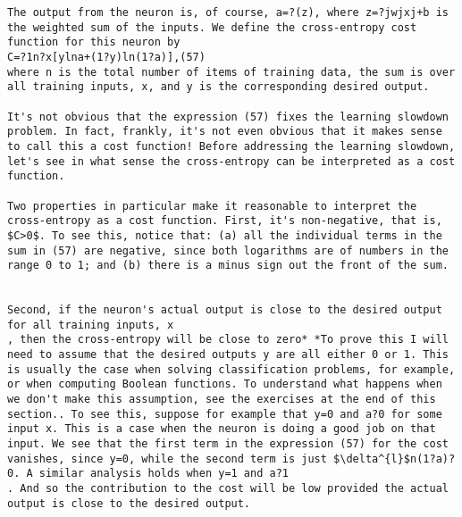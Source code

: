 \begin{lstlisting}
The output from the neuron is, of course, a=?(z), where z=?jwjxj+b is the weighted sum of the inputs. We define the cross-entropy cost function for this neuron by 
C=?1n?x[ylna+(1?y)ln(1?a)],(57)
where n is the total number of items of training data, the sum is over all training inputs, x, and y is the corresponding desired output.

It's not obvious that the expression (57) fixes the learning slowdown problem. In fact, frankly, it's not even obvious that it makes sense to call this a cost function! Before addressing the learning slowdown, let's see in what sense the cross-entropy can be interpreted as a cost function.

Two properties in particular make it reasonable to interpret the cross-entropy as a cost function. First, it's non-negative, that is, $C>0$. To see this, notice that: (a) all the individual terms in the sum in (57) are negative, since both logarithms are of numbers in the range 0 to 1; and (b) there is a minus sign out the front of the sum.


Second, if the neuron's actual output is close to the desired output for all training inputs, x
, then the cross-entropy will be close to zero* *To prove this I will need to assume that the desired outputs y are all either 0 or 1. This is usually the case when solving classification problems, for example, or when computing Boolean functions. To understand what happens when we don't make this assumption, see the exercises at the end of this section.. To see this, suppose for example that y=0 and a?0 for some input x. This is a case when the neuron is doing a good job on that input. We see that the first term in the expression (57) for the cost vanishes, since y=0, while the second term is just $\delta^{l}$n(1?a)?0. A similar analysis holds when y=1 and a?1
. And so the contribution to the cost will be low provided the actual output is close to the desired output.


\end{lstlisting}

